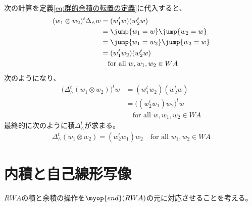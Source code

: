 	\begin{note}[群的な余積の転置の計算]\label{note:群的な余積の転置の計算} %
		次の計算を定義\eqref{eq:群的余積の転置の定義}に代入すると、
		\begin{equation*}\begin{split} %
			(w_1\otimes w_2)^t\Delta_\land w &= (w_1^tw)(w_2^tw) \\
			&= \jump{w_1=w}\jump{w_2=w} \\
			&= \jump{w_1=w_2}\jump{w_2=w} \\
			&= (w_1^tw_2)(w_2^tw) \\
			&\quad\text{for all }w,w_1,w_2\in WA
		\end{split}\end{equation*} %
		次のようになり、
		\begin{equation*}\begin{split} %
			\bigl(\Delta_\land^t(w_1\otimes w_2)\bigr)^tw 
			&= (w_1^tw_2)(w_2^tw) \\
			&= \bigl((w_2^tw_1)w_2\bigr)^tw \\
			&\quad\text{for all }w,w_1,w_2\in WA
		\end{split}\end{equation*} %
		最終的に次のように積$\Delta_\land^t$が求まる。
		\begin{equation*}\begin{split} %
			\Delta_\land^t(w_1\otimes w_2) = (w_2^tw_1)w_2
			\quad\text{for all }w_1,w_2\in WA
		\end{split}\end{equation*} %
	\end{note} %

\section{内積と自己線形写像}\label{s1:内積と自己線形写像} %
	$RWA$の積と余積の操作を$\myop{end}(RWA)$の元に対応させることを考える。

